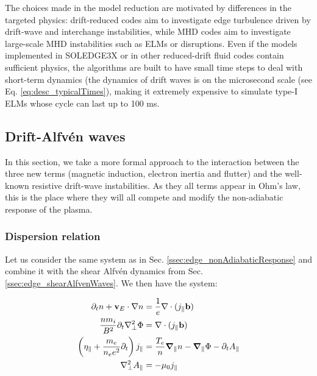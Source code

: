The choices made in the model reduction are motivated by differences in the targeted physics: drift-reduced codes aim to investigate edge turbulence driven by drift-wave and interchange instabilities, while MHD codes aim to investigate large-scale MHD instabilities such as ELMs\cite{pamela2017recent} or disruptions\cite{nardon2016progress}. Even if the models implemented in SOLEDGE3X or in other reduced-drift fluid codes contain sufficient physics, the algorithms are built to have small time steps to deal with short-term dynamics (the dynamics of drift waves is on the microsecond scale (see Eq. \ref{eq:desc_typicalTimes}), making it extremely expensive to simulate type-I ELMs whose cycle can last up to 100 ms.



\subsection{Drift-Alfvén waves}
\label{sec:edge_DAW}

In this section, we take a more formal approach to the interaction between the three new terms (magnetic induction, electron inertia and flutter) and the well-known resistive drift-wave instabilities. As they all terms appear in Ohm's law, this is the place where they will all compete and modify the non-adiabatic response of the plasma. 

\subsubsection{Dispersion relation}
\label{ssec:edge_DAW_dispersionRelation}

Let us consider the same system as in Sec. \ref{ssec:edge_nonAdiabaticResponse} and combine it with the shear Alfvén dynamics from Sec. \ref{ssec:edge_shearAlfvenWaves}. We then have the system: 

\begin{align}
	\partial_t n + \mathbf{v}_E\cdot\nabla n &= \frac{1}{e}\nabla\cdot(j_\parallel \mathbf{b}) \\
	\frac{nm_i}{B^2}\partial_t\nabla_\perp^2\Phi &= \nabla\cdot(j_\parallel \mathbf{b}) \\
	\left(\eta_\parallel + \frac{m_e}{n_ee^2}\partial_t \right) j_\parallel &= \frac{T_e}{n}\grad_\parallel n - \grad_\parallel \Phi - \partial_t A_\parallel \\
	\nabla_\perp^2 A_\parallel &= -\mu_0 j_\parallel
\end{align}


